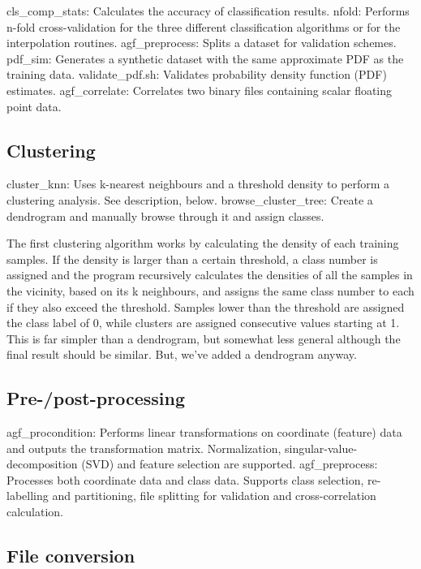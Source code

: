 \documentclass[12pt]{article}
\begin{document}
  cls_comp_stats:	Calculates the accuracy of classification results.
  nfold:		Performs n-fold cross-validation for the three different classification algorithms or for the interpolation routines.
  agf_preprocess:	Splits a dataset for validation schemes.
  pdf_sim:		Generates a synthetic dataset with the same approximate PDF as the training data.
  validate_pdf.sh:	Validates probability density function (PDF) estimates.
  agf_correlate:	Correlates two binary files containing scalar floating point data.

\subsection{Clustering}

  cluster_knn:	Uses k-nearest neighbours and a threshold density to perform
		  a clustering analysis.  See description, below.
  browse_cluster_tree:	Create a dendrogram and manually browse through it and assign classes.

  The first clustering algorithm works by calculating the density of each training samples.  If the density is larger than a certain threshold, a class number is assigned and the program recursively calculates the densities of all the samples in the vicinity, based on its k neighbours, and assigns the same class number to each if they also exceed the threshold.  Samples lower than the threshold are assigned the class label of 0, while clusters are assigned consecutive values starting at 1.  This is far simpler than a dendrogram, but somewhat less general although the final result should be similar.  But, we've added a dendrogram anyway.

\subsection{Pre-/post-processing}

  agf_procondition:	Performs linear transformations on coordinate (feature) data and outputs the transformation matrix.  Normalization, singular-value-decomposition (SVD) and feature selection are supported.
  agf_preprocess:	Processes both coordinate data and class data.  Supports class selection, re-labelling and partitioning, file splitting for validation and cross-correlation calculation.

\subsection{File conversion}
\end{document}
